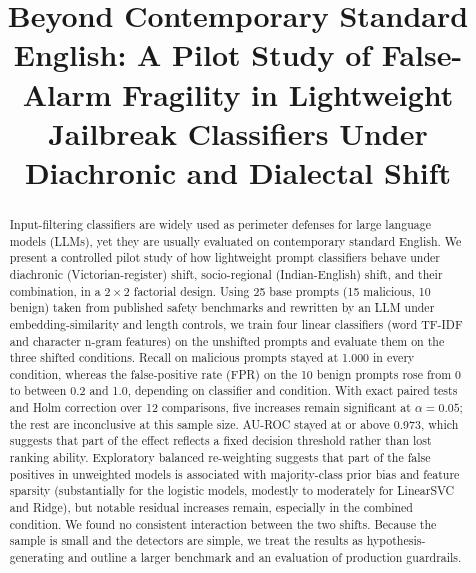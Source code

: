 \documentclass[conference]{IEEEtran}
\begin{document}
\title{Beyond Contemporary Standard English: A Pilot Study of False-Alarm Fragility in Lightweight Jailbreak Classifiers Under Diachronic and Dialectal Shift}

\author{
}

\maketitle

\begin{abstract}
Input-filtering classifiers are widely used as perimeter defenses for large language models (LLMs), yet they are usually evaluated on contemporary standard English. We present a controlled pilot study of how lightweight prompt classifiers behave under diachronic (Victorian-register) shift, socio-regional (Indian-English) shift, and their combination, in a $2 \times 2$ factorial design. Using 25 base prompts (15 malicious, 10 benign) taken from published safety benchmarks and rewritten by an LLM under embedding-similarity and length controls, we train four linear classifiers (word TF-IDF and character n-gram features) on the unshifted prompts and evaluate them on the three shifted conditions. Recall on malicious prompts stayed at 1.000 in every condition, whereas the false-positive rate (FPR) on the 10 benign prompts rose from 0 to between 0.2 and 1.0, depending on classifier and condition. With exact paired tests and Holm correction over 12 comparisons, five increases remain significant at $\alpha = 0.05$; the rest are inconclusive at this sample size. AU-ROC stayed at or above 0.973, which suggests that part of the effect reflects a fixed decision threshold rather than lost ranking ability. Exploratory balanced re-weighting suggests that part of the false positives in unweighted models is associated with majority-class prior bias and feature sparsity (substantially for the logistic models, modestly to moderately for LinearSVC and Ridge), but notable residual increases remain, especially in the combined condition. We found no consistent interaction between the two shifts. Because the sample is small and the detectors are simple, we treat the results as hypothesis-generating and outline a larger benchmark and an evaluation of production guardrails.
\end{abstract}
\end{document}
